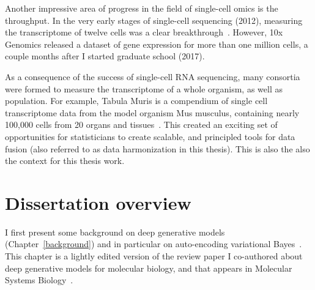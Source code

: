 Another impressive area of progress in the field of single-cell omics is the throughput. In the very early stages of single-cell sequencing (2012), measuring the transcriptome of twelve cells was a clear breakthrough~\cite{ramskold2012full}. However, 10x Genomics released a dataset of gene expression for more than one million cells, a couple months after I started graduate school (2017).

As a consequence of the success of single-cell RNA sequencing, many consortia were formed to measure the transcriptome of a whole organism, as well as population. For example, Tabula Muris is a compendium of single cell transcriptome data from the model organism Mus musculus, containing nearly 100,000 cells from 20 organs and tissues~\cite{tabula2018single}. This created an exciting set of opportunities for statisticians to create scalable, and principled tools for data fusion (also referred to as data harmonization in this thesis). This is also the also the context for this thesis work.

\section{Dissertation overview}

 I first present some background on deep generative models (Chapter~\ref{background}) and in particular on auto-encoding variational Bayes~\cite{kingma.auto}. This chapter is a lightly edited version of the review paper I co-authored about deep generative models for molecular biology, and that appears in Molecular Systems Biology~\cite{lopez2020enhancing}.

